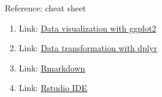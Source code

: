 \documentclass[
  ignorenonframetext,
]{beamer}
\begin{document}
\begin{frame}{Reference: cheat sheet}
\protect\hypertarget{reference-cheat-sheet}{}
\begin{enumerate}[<+->]
[1)]
\item
  Link:
  \href{https://github.com/rstudio/cheatsheets/blob/main/data-visualization.pdf}{Data
  visualization with ggplot2}
\item
  Link:
  \href{https://github.com/rstudio/cheatsheets/blob/main/data-transformation.pdf}{Data
  transformation with dplyr}
\item
  Link:
  \href{https://github.com/rstudio/cheatsheets/blob/main/rmarkdown.pdf}{Rmarkdown}
\item
  Link:
  \href{https://github.com/rstudio/cheatsheets/blob/main/rstudio-ide.pdf}{Rstudio
  IDE}
\end{enumerate}
\end{frame}
\end{document}
